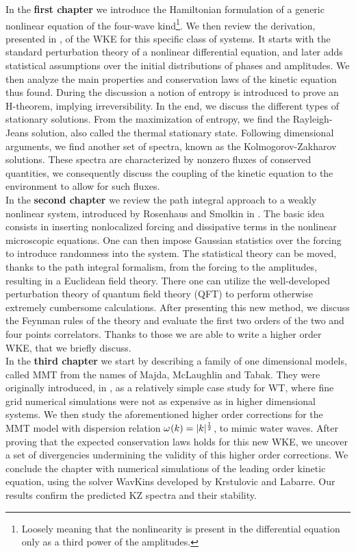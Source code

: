     In the \textbf{first chapter} we introduce the Hamiltonian formulation of a generic nonlinear equation of the four-wave kind\footnote{Loosely meaning that the nonlinearity is present in the differential equation only as a third power of the amplitudes.}. We then review the derivation, presented in \cite{Onorato2020}, of the WKE for this specific class of systems. It starts with the standard perturbation theory of a nonlinear differential equation, and later adds statistical assumptions over the initial distributions of phases and amplitudes. We then analyze the main properties and conservation laws of the kinetic equation thus found. During the discussion a notion of entropy is introduced to prove an H-theorem, implying irreversibility. In the end, we discuss the different types of stationary solutions. From the maximization of entropy, we find the Rayleigh-Jeans solution, also called the thermal stationary state. Following dimensional arguments, we find another set of spectra, known as the Kolmogorov-Zakharov solutions. These spectra are characterized by nonzero fluxes of conserved quantities, we consequently discuss the coupling of the kinetic equation to the environment to allow for such fluxes.\\
    In the \textbf{second chapter} we review the path integral approach to a weakly nonlinear system, introduced by Rosenhaus and Smolkin in \cite{Rosenhaus2023}. The basic idea consists in inserting nonlocalized forcing and dissipative terms in the nonlinear microscopic equations. One can then impose Gaussian statistics over the forcing to introduce randomness into the system. The statistical theory can be moved, thanks to the path integral formalism, from the forcing to the amplitudes, resulting in a Euclidean field theory. There one can utilize the well-developed perturbation theory of quantum field theory (QFT) to perform otherwise extremely cumbersome calculations. After presenting this new method, we discuss the Feynman rules of the theory and evaluate the first two orders of the two and four points correlators. Thanks to those we are able to write a higher order WKE, that we briefly discuss.\\
    In the \textbf{third chapter} we start by describing a family of one dimensional models, called MMT from the names of Majda, McLaughlin and Tabak. They were originally introduced, in \cite{Majda1997}, as a relatively simple case study for WT, where fine grid numerical simulations were not as expensive as in higher dimensional systems. We then study the aforementioned higher order corrections for the MMT model with dispersion relation $\omega^{} (k) = |k|^\frac{1}{2}$, to mimic water waves. After proving that the expected conservation laws holds for this new WKE, we uncover a set of divergencies undermining the validity of this higher order corrections. We conclude the chapter with numerical simulations of the leading order kinetic equation, using the solver WavKins developed by Krstulovic and Labarre. Our results confirm the predicted  KZ spectra and their stability. 



    

